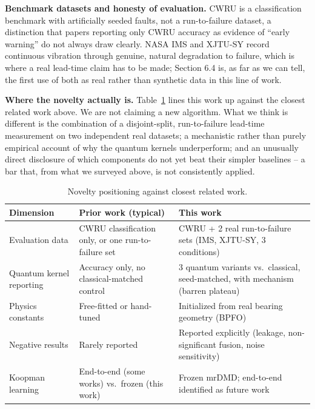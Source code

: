 \documentclass[3p,times,procedia]{elsarticle}
\begin{document}
\textbf{Benchmark datasets and honesty of evaluation.} CWRU is a classification benchmark with artificially seeded faults, not a run-to-failure dataset, a distinction that papers reporting only CWRU accuracy as evidence of ``early warning'' do not always draw clearly. NASA IMS \cite{qiu2006} and XJTU-SY \cite{wang2020} record continuous vibration through genuine, natural degradation to failure, which is where a real lead-time claim has to be made; Section 6.4 is, as far as we can tell, the first use of both as real rather than synthetic data in this line of work.

\textbf{Where the novelty actually is.} Table~\ref{tab:novelty} lines this work up against the closest related work above. We are not claiming a new algorithm. What we think is different is the combination of a disjoint-split, run-to-failure lead-time measurement on two independent real datasets; a mechanistic rather than purely empirical account of why the quantum kernels underperform; and an unusually direct disclosure of which components do not yet beat their simpler baselines -- a bar that, from what we surveyed above, is not consistently applied.

\begin{table}[ht]
\caption{Novelty positioning against closest related work.}
\label{tab:novelty}
\centering
\begin{tabular}{p{2.8cm} p{4.5cm} p{5cm}}
\toprule
\textbf{Dimension} & \textbf{Prior work (typical)} & \textbf{This work} \\
\midrule
Evaluation data & CWRU classification only, or one run-to-failure set & CWRU + 2 real run-to-failure sets (IMS, XJTU-SY, 3 conditions) \\
Quantum kernel reporting & Accuracy only, no classical-matched control & 3 quantum variants vs.\ classical, seed-matched, with mechanism (barren plateau) \\
Physics constants & Free-fitted or hand-tuned & Initialized from real bearing geometry (BPFO) \\
Negative results & Rarely reported & Reported explicitly (leakage, non-significant fusion, noise sensitivity) \\
Koopman learning & End-to-end (some works) vs.\ frozen (this work) & Frozen mrDMD; end-to-end identified as future work \\
\bottomrule
\end{tabular}
\end{table}

\end{document}
